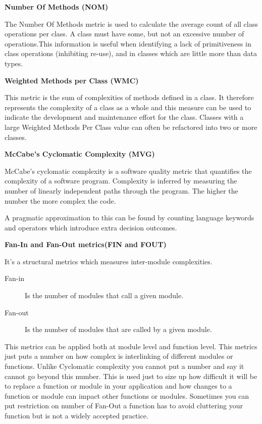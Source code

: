 \textbf{Number Of Methods (NOM)}

The Number Of Methods metric is used to calculate the average count of all class operations per
class. A class must have some, but not an excessive number of operations.This information is useful when identifying a lack of primitiveness in class operations (inhibiting
re-use), and in classes which are little more than data types.

\textbf{Weighted Methods per Class (WMC)}

This metric is the sum of complexities of methods defined in a class. It therefore represents the
complexity of a class as a whole and this measure can be used to indicate the development and
maintenance effort for the class. Classes with a large Weighted Methods Per Class value can often be refactored into two or more classes.

\textbf{McCabe's Cyclomatic Complexity (MVG)}

McCabe's cyclomatic complexity is a software quality metric that quantifies the complexity of a software program. Complexity is inferred by measuring the number of linearly independent paths through the program. The higher the number the more complex the code.

A pragmatic approximation to this can be found by counting language keywords and operators which introduce extra decision outcomes.

\textbf{Fan-In and Fan-Out metrics(FIN and FOUT)}

It's a structural metrics which measures inter-module complexities. 
\begin{description}
	\item[Fan-in] Is the number of modules that call a given module.
	\item[Fan-out] Is the number of modules that are called by a given module.
\end{description}


This metrics can be applied both at module level and function level. This metrics just puts a number on how complex is interlinking of different modules or functions. Unlike Cyclomatic complexity you cannot put a number and say it cannot go beyond this number. This is used just to size up how
difficult it will be to replace a function or module in your application and how changes to a function or module can impact other functions or modules. Sometimes you can put restriction on number of Fan-Out a function has to avoid cluttering your function but is not a widely accepted practice.


